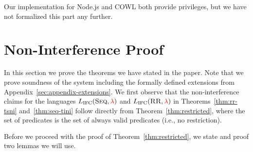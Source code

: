 \documentclass{llncs}
\newcommand{\Red}[1]{{\color{red} #1}}
\begin{document}
Our implementation for Node.js and COWL both provide privileges, but
we have not formalized this part any further.












\section{Non-Interference Proof}
\label{sec:appendix}
\label{sec:app:proof}

In this section we prove the theorems we have stated in the paper.
Note that we prove soundness of the system including the formally
defined extensions from Appendix~\ref{sec:appendix-extensions}.
We first observe that the non-interference claims for the languages
\ensuremath{L_\text{IFC}(\textsc{Seq},\Red{\lambda})} and \ensuremath{L_\text{IFC}(\textsc{RR},\Red{\lambda})}
in Theorems~\ref{thm:rr-tsni} and~\ref{thm:seq-tini} follow directly
from Theorem~\ref{thm:restricted}, where the set
of predicates is the set of always valid predicates (i.e., no restriction).

Before we proceed with the proof of Theorem~\ref{thm:restricted},
we state and proof two lemmas we will use.
\end{document}
